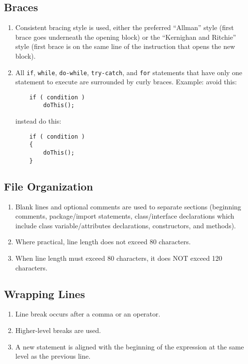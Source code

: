 \subsection*{Braces}\begin{enumerate}[resume, label=C\arabic*., ref=C\arabic*]
\item \checklistref Consistent bracing style is used, either the preferred ``Allman'' style (first brace goes underneath the opening block) or the ``Kernighan and Ritchie'' style (first brace is on the same line of the instruction that opens the new block).
\item \checklistref All \texttt{if}, \texttt{while}, \texttt{do-while}, \texttt{try-catch}, and \texttt{for} statements that have only one statement to execute are surrounded by curly braces. Example:
avoid this:


\begin{verbatim}
    if ( condition )
        doThis();
\end{verbatim}

instead do this:

\begin{verbatim}
    if ( condition ) 
    {
        doThis(); 
    }
\end{verbatim}

\end{enumerate}

\subsection*{File Organization}\begin{enumerate}[resume, label=C\arabic*., ref=C\arabic*]
\item \checklistref Blank lines and optional comments are used to separate sections (beginning comments, package/import statements, class/interface declarations which include class variable/attributes declarations, constructors, and methods).
\item \checklistref Where practical, line length does not exceed 80 characters.
\item \checklistref When line length must exceed 80 characters, it does NOT exceed 120 characters.
\end{enumerate}

\subsection*{Wrapping Lines}\begin{enumerate}[resume, label=C\arabic*., ref=C\arabic*]
\item \checklistref Line break occurs after a comma or an operator.
\item \checklistref Higher-level breaks are used.
\item \checklistref A new statement is aligned with the beginning of the expression at the same level as the previous line.
\end{enumerate}


